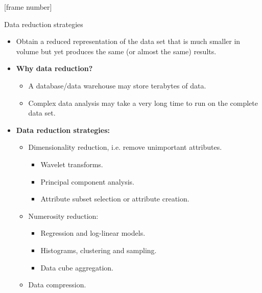 \documentclass[aspectratio=169,t]{beamer}
\begin{document}
  {
    [frame number]
    \begin{frame}{Data reduction strategies}
        \begin{itemize}
            \item Obtain a reduced representation of the data set that is much smaller in volume but yet produces the same (or almost the same)  results.
            \item \textbf{Why data reduction?}\\
            \begin{itemize}
              \item A database/data warehouse may store terabytes of data.
              \item Complex data analysis may take a very long time to run on the complete data set.
            \end{itemize}
            \item \textbf{Data reduction strategies:}
            \begin{itemize}
              \item Dimensionality reduction, i.e. remove unimportant attributes.
              \begin{itemize}
                \item Wavelet transforms.
                \item Principal component analysis.
                \item Attribute subset selection or attribute creation.
              \end{itemize}
              \item Numerosity reduction:
              \begin{itemize}
                \item Regression and log-linear models.
                \item Histograms, clustering and sampling.
                \item Data cube aggregation.
              \end{itemize}
              \item Data compression.
            \end{itemize}
        \end{itemize}
    \end{frame}
  }
\end{document}
